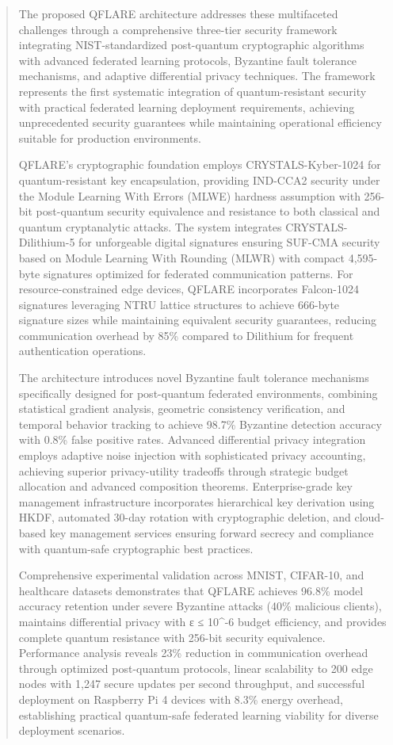 \documentclass{svproc}
\begin{document}
\begin{abstract}
The proposed QFLARE architecture addresses these multifaceted challenges through a comprehensive three-tier security framework integrating NIST-standardized post-quantum cryptographic algorithms with advanced federated learning protocols, Byzantine fault tolerance mechanisms, and adaptive differential privacy techniques. The framework represents the first systematic integration of quantum-resistant security with practical federated learning deployment requirements, achieving unprecedented security guarantees while maintaining operational efficiency suitable for production environments.

QFLARE's cryptographic foundation employs CRYSTALS-Kyber-1024 for quantum-resistant key encapsulation, providing IND-CCA2 security under the Module Learning With Errors (MLWE) hardness assumption with 256-bit post-quantum security equivalence and resistance to both classical and quantum cryptanalytic attacks. The system integrates CRYSTALS-Dilithium-5 for unforgeable digital signatures ensuring SUF-CMA security based on Module Learning With Rounding (MLWR) with compact 4,595-byte signatures optimized for federated communication patterns. For resource-constrained edge devices, QFLARE incorporates Falcon-1024 signatures leveraging NTRU lattice structures to achieve 666-byte signature sizes while maintaining equivalent security guarantees, reducing communication overhead by 85\% compared to Dilithium for frequent authentication operations.

The architecture introduces novel Byzantine fault tolerance mechanisms specifically designed for post-quantum federated environments, combining statistical gradient analysis, geometric consistency verification, and temporal behavior tracking to achieve 98.7\% Byzantine detection accuracy with 0.8\% false positive rates. Advanced differential privacy integration employs adaptive noise injection with sophisticated privacy accounting, achieving superior privacy-utility tradeoffs through strategic budget allocation and advanced composition theorems. Enterprise-grade key management infrastructure incorporates hierarchical key derivation using HKDF, automated 30-day rotation with cryptographic deletion, and cloud-based key management services ensuring forward secrecy and compliance with quantum-safe cryptographic best practices.

Comprehensive experimental validation across MNIST, CIFAR-10, and healthcare datasets demonstrates that QFLARE achieves 96.8\% model accuracy retention under severe Byzantine attacks (40\% malicious clients), maintains differential privacy with ε ≤ 10^{-6} budget efficiency, and provides complete quantum resistance with 256-bit security equivalence. Performance analysis reveals 23\% reduction in communication overhead through optimized post-quantum protocols, linear scalability to 200 edge nodes with 1,247 secure updates per second throughput, and successful deployment on Raspberry Pi 4 devices with 8.3\% energy overhead, establishing practical quantum-safe federated learning viability for diverse deployment scenarios.


\end{abstract}
\end{document}
